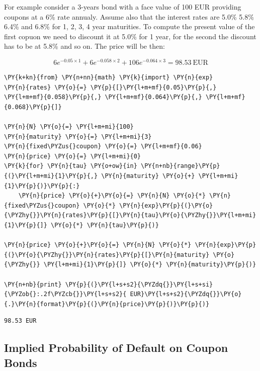 For example consider a 3-years bond with a face value of 100 EUR
providing coupons at a 6\% rate annualy. Assume also that the interest
rates are 5.0\% 5.8\% 6.4\% and 6.8\% for 1, 2, 3, 4 year maturities. To
compute the present value of the first copuon we need to discount it at
5.0\% for 1 year, for the second the discount has to be at 5.8\% and so
on. The price will be then:

\[6e^{-0.05\times 1}+6e^{-0.058\times 2}+106e^{-0.064\times 3} = 98.53~\textrm{EUR}\]

    \begin{tcolorbox}[breakable, size=fbox, boxrule=1pt, pad at break*=1mm,colback=cellbackground, colframe=cellborder]
\begin{Verbatim}[commandchars=\\\{\}]
\PY{k+kn}{from} \PY{n+nn}{math} \PY{k}{import} \PY{n}{exp}
\PY{n}{rates} \PY{o}{=} \PY{p}{[}\PY{l+m+mf}{0.05}\PY{p}{,} \PY{l+m+mf}{0.058}\PY{p}{,} \PY{l+m+mf}{0.064}\PY{p}{,} \PY{l+m+mf}{0.068}\PY{p}{]}

\PY{n}{N} \PY{o}{=} \PY{l+m+mi}{100}
\PY{n}{maturity} \PY{o}{=} \PY{l+m+mi}{3}
\PY{n}{fixed\PYZus{}coupon} \PY{o}{=} \PY{l+m+mf}{0.06}
\PY{n}{price} \PY{o}{=} \PY{l+m+mi}{0}
\PY{k}{for} \PY{n}{tau} \PY{o+ow}{in} \PY{n+nb}{range}\PY{p}{(}\PY{l+m+mi}{1}\PY{p}{,} \PY{n}{maturity} \PY{o}{+} \PY{l+m+mi}{1}\PY{p}{)}\PY{p}{:}
    \PY{n}{price} \PY{o}{+}\PY{o}{=} \PY{n}{N} \PY{o}{*} \PY{n}{fixed\PYZus{}coupon} \PY{o}{*} \PY{n}{exp}\PY{p}{(}\PY{o}{\PYZhy{}}\PY{n}{rates}\PY{p}{[}\PY{n}{tau}\PY{o}{\PYZhy{}}\PY{l+m+mi}{1}\PY{p}{]} \PY{o}{*} \PY{n}{tau}\PY{p}{)}

\PY{n}{price} \PY{o}{+}\PY{o}{=} \PY{n}{N} \PY{o}{*} \PY{n}{exp}\PY{p}{(}\PY{o}{\PYZhy{}}\PY{n}{rates}\PY{p}{[}\PY{n}{maturity} \PY{o}{\PYZhy{}} \PY{l+m+mi}{1}\PY{p}{]} \PY{o}{*} \PY{n}{maturity}\PY{p}{)}
    
\PY{n+nb}{print} \PY{p}{(}\PY{l+s+s2}{\PYZdq{}}\PY{l+s+si}{\PYZob{}:.2f\PYZcb{}}\PY{l+s+s2}{ EUR}\PY{l+s+s2}{\PYZdq{}}\PY{o}{.}\PY{n}{format}\PY{p}{(}\PY{n}{price}\PY{p}{)}\PY{p}{)}
\end{Verbatim}
\end{tcolorbox}

    \begin{Verbatim}[commandchars=\\\{\}]
98.53 EUR
    \end{Verbatim}

 \subsection{Implied Probability of Default on Coupon Bonds}\label{default-probabilities-and-bond-prices}

